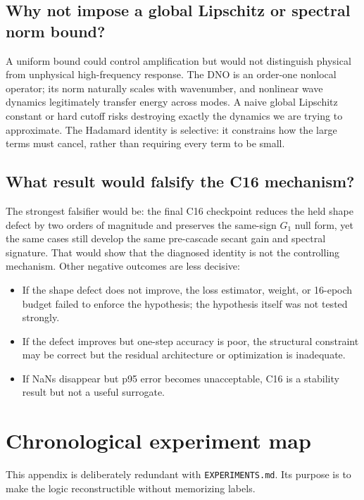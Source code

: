 \documentclass[11pt]{article}
\begin{document}
\subsection{Why not impose a global Lipschitz or spectral norm bound?}

A uniform bound could control amplification but would not distinguish physical
from unphysical high-frequency response.  The DNO is an order-one nonlocal
operator; its norm naturally scales with wavenumber, and nonlinear wave
dynamics legitimately transfer energy across modes.  A naive global Lipschitz
constant or hard cutoff risks destroying exactly the dynamics we are trying to
approximate.  The Hadamard identity is selective: it constrains how the large
terms must cancel, rather than requiring every term to be small.

\subsection{What result would falsify the C16 mechanism?}

The strongest falsifier would be: the final C16 checkpoint reduces the held
shape defect by two orders of magnitude and preserves the same-sign \(G_1\)
null form, yet the same cases still develop the same pre-cascade secant gain
and spectral signature.  That would show that the diagnosed identity is not
the controlling mechanism.  Other negative outcomes are less decisive:
\begin{itemize}
  \item If the shape defect does not improve, the loss estimator, weight, or
        16-epoch budget failed to enforce the hypothesis; the hypothesis itself
        was not tested strongly.
  \item If the defect improves but one-step accuracy is poor, the structural
        constraint may be correct but the residual architecture or optimization
        is inadequate.
  \item If NaNs disappear but p95 error becomes unacceptable, C16 is a stability
        result but not a useful surrogate.
\end{itemize}

\appendix
\section{Chronological experiment map}

This appendix is deliberately redundant with \texttt{EXPERIMENTS.md}.  Its
purpose is to make the logic reconstructible without memorizing labels.
\end{document}
